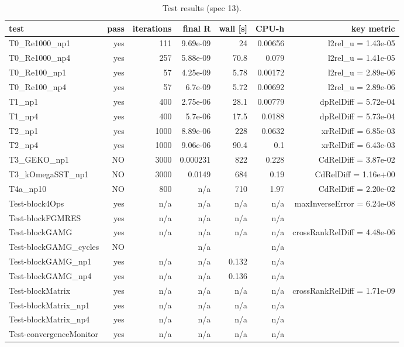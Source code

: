 \begin{table}[tbp]
\centering
\small
\caption{Test results (spec 13).}
\label{tab:tests}
\begin{tabular}{lrrrrrr}
\toprule
test & pass & iterations & final R & wall [s] & CPU-h & key metric \\
\midrule
T0\_Re1000\_np1 & yes & 111 & 9.69e-09 & 24 & 0.00656 & l2rel\_u = 1.43e-05 \\
T0\_Re1000\_np4 & yes & 257 & 5.88e-09 & 70.8 & 0.079 & l2rel\_u = 1.41e-05 \\
T0\_Re100\_np1 & yes & 57 & 4.25e-09 & 5.78 & 0.00172 & l2rel\_u = 2.89e-06 \\
T0\_Re100\_np4 & yes & 57 & 6.7e-09 & 5.72 & 0.00692 & l2rel\_u = 2.89e-06 \\
T1\_np1 & yes & 400 & 2.75e-06 & 28.1 & 0.00779 & dpRelDiff = 5.72e-04 \\
T1\_np4 & yes & 400 & 5.7e-06 & 17.5 & 0.0188 & dpRelDiff = 5.73e-04 \\
T2\_np1 & yes & 1000 & 8.89e-06 & 228 & 0.0632 & xrRelDiff = 6.85e-03 \\
T2\_np4 & yes & 1000 & 9.06e-06 & 90.4 & 0.1 & xrRelDiff = 6.43e-03 \\
T3\_GEKO\_np1 & NO & 3000 & 0.000231 & 822 & 0.228 & CdRelDiff = 3.87e-02 \\
T3\_kOmegaSST\_np1 & NO & 3000 & 0.0149 & 684 & 0.19 & CdRelDiff = 1.16e+00 \\
T4a\_np10 & NO & 800 & n/a & 710 & 1.97 & CdRelDiff = 2.20e-02 \\
Test-block4Ops & yes & n/a & n/a & n/a & n/a & maxInverseError = 6.24e-08 \\
Test-blockFGMRES & yes & n/a & n/a & n/a & n/a &  \\
Test-blockGAMG & yes & n/a & n/a & n/a & n/a & crossRankRelDiff = 4.48e-06 \\
Test-blockGAMG\_cycles & NO &  & n/a &  & n/a &  \\
Test-blockGAMG\_np1 & yes & n/a & n/a & 0.132 & n/a &  \\
Test-blockGAMG\_np4 & yes & n/a & n/a & 0.136 & n/a &  \\
Test-blockMatrix & yes & n/a & n/a & n/a & n/a & crossRankRelDiff = 1.71e-09 \\
Test-blockMatrix\_np1 & yes & n/a & n/a & n/a & n/a &  \\
Test-blockMatrix\_np4 & yes & n/a & n/a & n/a & n/a &  \\
Test-convergenceMonitor & yes & n/a & n/a & n/a & n/a &  \\

\end{tabular}
\end{table}
